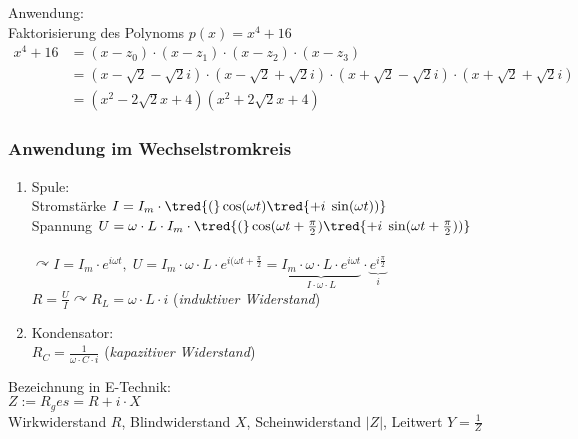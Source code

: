 Anwendung: \\
Faktorisierung des Polynoms $p(x)=x^4+16$
\begin{align*}
x^4+16 &= (x-z_0)\cdot(x-z_1)\cdot(x-z_2)\cdot(x-z_3)\\
&= (x-\sqrt{2}-\sqrt{2}i)\cdot (x-\sqrt{2}+\sqrt{2}i)\cdot (x+\sqrt{2}-\sqrt{2}i) \cdot (x+\sqrt{2}+\sqrt{2}i)\\
&= (x^2-2\sqrt{2}x+4)(x^2+2\sqrt{2}x+4)
\end{align*}

\subsubsection{Anwendung im Wechselstromkreis}
\begin{enumerate}
\item Spule: \\
Stromstärke $I=I_m\cdot \tred{(}\cos(\omega t) \tred{+ i \; \sin(\omega t))}$\\
Spannung $U=\omega \cdot L\cdot I_m \cdot \tred{(}\cos(\omega t +\frac{\pi}{2}) \tred{+ i \; \sin(\omega t  +\frac{\pi}{2}))}$\\
\\
$\curvearrowright I=I_m \cdot e^{i\omega t}, \; U=I_m\cdot \omega \cdot L \cdot e^{i(\omega t+\frac{\pi}{2}}=\underbrace{I_m\cdot \omega \cdot L \cdot e^{i\omega t}}_{I\cdot \omega \cdot L}\cdot \underbrace{e^{i\frac{\pi}{2}}}_i$\\
$R=\frac{U}{I}\curvearrowright \boxed{R_L=\omega \cdot L \cdot i}$ (\emph{induktiver Widerstand})
\item Kondensator: \\
$\boxed{R_C=\frac{1}{\omega \cdot C \cdot i}}$ (\emph{kapazitiver Widerstand})
\end{enumerate}
Bezeichnung in E-Technik:\\
$Z:= R_ges = R+i\cdot X$\\
Wirkwiderstand $R$, Blindwiderstand $X$, Scheinwiderstand $|Z|$, Leitwert $Y=\frac{1}{Z}$

